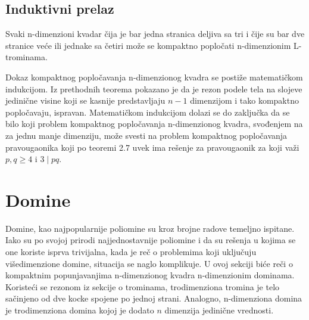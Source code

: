 

\subsection{Induktivni prelaz}
\begin{Theorem}
    Svaki n-dimenzioni kvadar čija je bar jedna stranica deljiva sa tri i čije su bar dve stranice veće ili jednake sa četiri može se kompaktno popločati n-dimenzionim L-trominama.
\end{Theorem}





Dokaz kompaktnog popločavanja n-dimenzionog kvadra se postiže matematičkom indukcijom. Iz prethodnih teorema pokazano je da je rezon podele tela na slojeve jedinične visine koji se kasnije predstavljaju $n-1$ dimenzijom i tako kompaktno popločavaju, ispravan. Matematičkom indukcijom dolazi se do zaključka da se bilo koji problem kompaktnog popločavanja n-dimenzionog kvadra, svođenjem na za jednu manje dimenziju, može svesti na problem kompaktnog popločavanja pravougaonika koji po teoremi 2.7 uvek ima rešenje za pravougaonik za koji važi $p,q \geq 4$ i $3\mid pq$.

\section{Domine}

Domine, kao najpopularnije poliomine su kroz brojne radove temeljno ispitane. Iako su po svojoj prirodi najjednostavnije poliomine i da su rešenja u kojima se one koriste isprva trivijalna, kada je reč o problemima koji uključuju višedimenzione domine, situacija se naglo komplikuje. U ovoj sekciji biće reči o kompaktnim popunjavanjima n-dimenzionog kvadra n-dimenzionim dominama. Koristeći se rezonom iz sekcije o trominama, trodimenziona tromina je telo sačinjeno od dve kocke spojene po jednoj strani. Analogno, n-dimenziona domina je trodimenziona domina kojoj je dodato $n$ dimenzija jedinične vrednosti.


